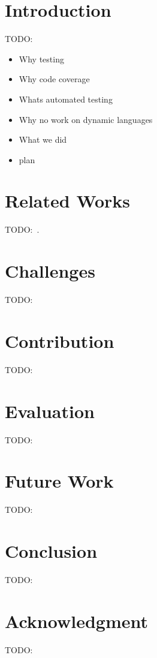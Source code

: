 \documentclass{llncs2e/llncs}
\def\todo#1{{\color{red}TODO:\quad#1}}
\begin{document}
\vfill

\begin{abstract}
  \todo{}
Despite popular usage, most of the dynamically typed languages still lack
automated test data generation tools.  Most of the existing tools and
approaches depend critically on static and explicit types, which makes it hard
to port any of them over to dynamically typed languages. In this paper we
present a search-based test data generation tool, NAME, which focuses on
primitive types and lists of Python. NAME not only searches for test input
values but also for appropriate types for each input argument. We evaluate NAME
based on the structural coverage it achieves, the cost of the type search, and
the overhead for the execution of the function under test. We further discuss
the future of automated testing for dynamic and object-oriented languages based
on our experience.
\end{abstract}
%
\newpage


\section{Introduction}
\todo{}

\begin{itemize}
  \item Why testing
  \item Why code coverage
  \item Whats automated testing
  \item Why no work on dynamic languages
  \item What we did
  \item plan
\end{itemize}


\section{Related Works}
\todo{}~\cite{mairhofer2011search}.


\section{Challenges}
\todo{}


\section{Contribution}
\todo{}


\section{Evaluation}
\todo{}


\section{Future Work}
\todo{}


\section{Conclusion}
\todo{}


\section*{Acknowledgment}
\todo{}



\end{document}
